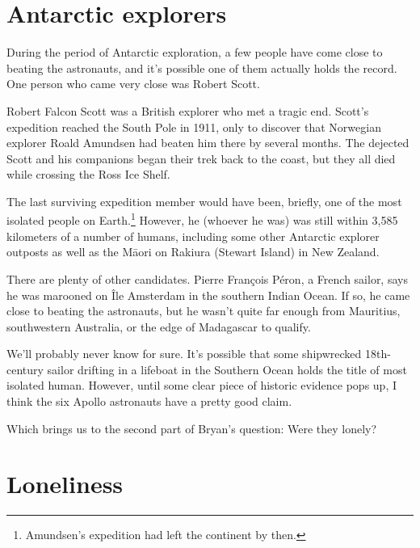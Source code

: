 {\section*{Antarctic explorers}

{During the period of Antarctic exploration, a few people have come close to beating the astronauts, and it's possible one of them actually holds the record. One person who came very close was Robert Scott.}

{Robert Falcon Scott was a British explorer who met a tragic end. Scott's expedition reached the South Pole in 1911, only to discover that Norwegian explorer Roald Amundsen had beaten him there by several months. The dejected Scott and his companions began their trek back to the coast, but they all died while crossing the Ross Ice Shelf.}

{The last surviving expedition member would have been, briefly, one of the most isolated people on Earth.{\footnote{Amundsen's expedition had left the continent by then.} } However, he (whoever he was) was still within 3,585 kilometers of a number of humans, including some other Antarctic explorer outposts as well as the Māori on Rakiura (Stewart Island) in New Zealand.}

{There are plenty of other candidates. Pierre François Péron, a French sailor, says he was marooned on Île Amsterdam in the southern Indian Ocean. If so, he came close to beating the astronauts, but he wasn't quite far enough from Mauritius, southwestern Australia, or the edge of Madagascar to qualify.}

{We'll probably never know for sure. It's possible that some shipwrecked 18th-century sailor drifting in a lifeboat in the Southern Ocean holds the title of most isolated human. However, until some clear piece of historic evidence pops up, I think the six Apollo astronauts have a pretty good claim.}

{Which brings us to the second part of Bryan's question: Were they lonely?}

\section*{Loneliness}

}
